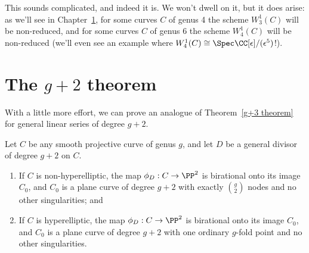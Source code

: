 This sounds complicated, and indeed it is. We won't  dwell on it, but it does arise: as we'll see in Chapter~\ref{}, for some curves $C$ of genus 4 the scheme $W^1_3(C)$ will be non-reduced, and for some curves $C$ of genus 6 the scheme $W^1_4(C)$ will be non-reduced (we'll even see an example where $W^1_4(C) \cong \Spec \CC[\epsilon]/(\epsilon^5)$!). 

\section{The $g+2$ theorem}

With a little more effort, we can prove an analogue of Theorem~\ref{g+3 theorem} for general linear series of degree $g+2$.

\begin{theorem}
Let $C$ be any smooth projective curve of genus $g$, and let $D$ be a general divisor of degree $g+2$ on $C$. 
\begin{enumerate}
\item If $C$ is non-hyperelliptic, the map $\phi_D : C \to \PP^2$ is birational onto its image $C_0$, and $C_0$ is a plane curve of degree $g+2$ with exactly $\binom{g}{2}$ nodes and no other singularities; and
\item If $C$ is hyperelliptic, the map $\phi_D : C \to \PP^2$ is birational onto its image $C_0$, and $C_0$ is a plane curve of degree $g+2$ with one ordinary $g$-fold point and no other singularities.
\end{enumerate}
\end{theorem}

